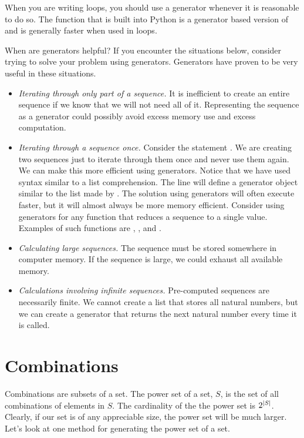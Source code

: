 When you are writing  loops, you should use a generator whenever it is reasonable to do so.
The  function that is built into Python is a generator based version of  and is generally faster when used in  loops.

When are generators helpful? If you encounter the situations below, consider trying to solve 
your problem using generators.  Generators have proven to be very useful in these situations.
\begin{itemize}
\item \emph{Iterating through only part of a sequence.}
It is inefficient to create an entire sequence if we know that we will not need all of it.
Representing the sequence as a generator could possibly avoid excess memory use and excess computation.
\item \emph{Iterating through a sequence once.} Consider the statement 
.
We are creating two sequences just to iterate through them once and never use them again.
We can make this more efficient using generators.
Notice that we have used syntax similar to a list comprehension.
The line  will define a generator object similar to the list made by \li{[i for i in xrange(1000) if i\%2 == 0]}.
The solution using generators will often execute faster, but it will almost always be more memory efficient.  Consider using generators for any function that reduces a sequence to a single value.  Examples of such functions are , , and .
\item \emph{Calculating large sequences.}  The sequence must be stored somewhere in computer memory.
If the sequence is large, we could exhaust all available memory.
\item \emph{Calculations involving infinite sequences.}  Pre-computed sequences are necessarily finite.  We cannot create a list that stores all natural numbers, but we can create a generator that returns the next natural number every time it is called.
\end{itemize}


\section*{Combinations}
Combinations are subsets of a set.  The power set of a set, $S$, is the set of all combinations
of elements in $S$.  The cardinality of the the power set is $2^{\left\lvert S\right\rvert}$.  Clearly, if our
set is of any appreciable size, the power set will be much larger.  Let's look at one method for
generating the power set of a set.

